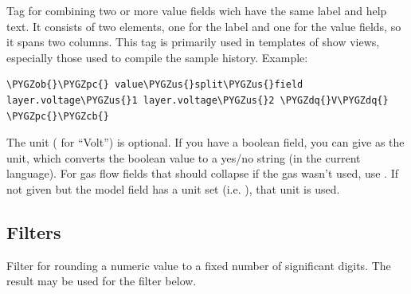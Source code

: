 \documentclass[a4paper,11pt,english]{sphinxmanual}
\def\PYGZus{\char`\_}
\def\PYGZob{\char`\{}
\def\PYGZcb{\char`\}}
\def\PYGZpc{\char`\%}
\def\PYGZdq{\char`\"}
\begin{document}

\begin{fulllineitems}
\label{programming/template_tags_and_filters:samples.templatetags.samples_extras.value_split_field}
Tag for combining two or more value fields wich have the same label and
help text.  It consists of two  elements, one for the label and one
for the value fields, so it spans two columns.  This tag is primarily used
in templates of show views, especially those used to compile the sample
history.  Example:

\begin{Verbatim}[commandchars=\\\{\},formatcom=\scriptsize]
\PYGZob{}\PYGZpc{} value\PYGZus{}split\PYGZus{}field layer.voltage\PYGZus{}1 layer.voltage\PYGZus{}2 \PYGZdq{}V\PYGZdq{} \PYGZpc{}\PYGZcb{}
\end{Verbatim}

The unit ( for “Volt”) is optional.  If you have a boolean field,
you can give  as the unit, which converts the boolean value to
a yes/no string (in the current language).  For gas flow fields that should
collapse if the gas wasn't used, use .  If not given but
the model field has a unit set (i.e. ), that unit is
used.

\end{fulllineitems}



\subsection{Filters}
\label{programming/template_tags_and_filters:id2}

\begin{fulllineitems}
\label{programming/template_tags_and_filters:samples.templatetags.samples_extras.round}
Filter for rounding a numeric value to a fixed number of significant digits.
The result may be used for the  filter below.

\end{fulllineitems}

\end{document}
